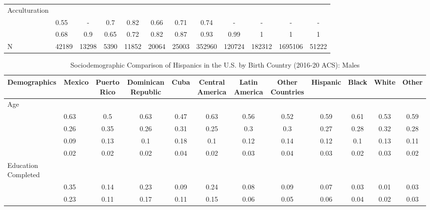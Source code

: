 \documentclass[
]{article}
\begin{document}
\begin{landscape}
\begin{table}[ht]
\begin{tabular}{>{\raggedright\arraybackslash}p{3.2cm}|lcccccc|cccc}
  Acculturation &  &  &  &  &  &  &  &  &  &  &  \\ 
  \multicolumn{1}{>{\raggedleft\arraybackslash}p{1.6cm}|}{\makebox[1.6cm][r]{Citizen }}& 0.55 & - & 0.7 & 0.82 & 0.66 & 0.71 & 0.74 & - & - & - & - \\ 
  \multicolumn{1}{>{\raggedleft\arraybackslash}p{3cm}|}{\makebox[3cm][r]{English Speakers }}& 0.68 & 0.9 & 0.65 & 0.72 & 0.82 & 0.87 & 0.93 & 0.99 & 1 & 1 & 1 \\ 
  N & 42189 & 13298 & 5390 & 11852 & 20064 & 25003 & 352960 & 120724 & 182312 & 1695106 & 51222 \\ 
   \hline
\end{tabular}
\endgroup
\end{table}


\begin{table}[ht]
\centering
\caption{Sociodemographic Comparison of Hispanics in the U.S. by Birth Country (2016-20 ACS): Males} 
\begingroup\small
\begin{tabular}{>{\raggedright\arraybackslash}p{3.2cm}|lcccccc|cccc}
  \hline
Demographics & Mexico & Puerto Rico & Dominican Republic & Cuba & Central America & Latin America & Other Countries & Hispanic & Black & White & Other \\ 
  \hline
Age &  &  &  &  &  &  &  &  &  &  &  \\ 
  \multicolumn{1}{>{\raggedleft\arraybackslash}p{1.5cm}|}{\makebox[1.5cm][r]{60 - 69 }}& 0.63 & 0.5 & 0.63 & 0.47 & 0.63 & 0.56 & 0.52 & 0.59 & 0.61 & 0.53 & 0.59 \\ 
  \multicolumn{1}{>{\raggedleft\arraybackslash}p{1.5cm}|}{\makebox[1.5cm][r]{70 - 79 }}& 0.26 & 0.35 & 0.26 & 0.31 & 0.25 & 0.3 & 0.3 & 0.27 & 0.28 & 0.32 & 0.28 \\ 
  \multicolumn{1}{>{\raggedleft\arraybackslash}p{1.5cm}|}{\makebox[1.5cm][r]{80 - 89 }}& 0.09 & 0.13 & 0.1 & 0.18 & 0.1 & 0.12 & 0.14 & 0.12 & 0.1 & 0.13 & 0.11 \\ 
  \multicolumn{1}{>{\raggedleft\arraybackslash}p{1.5cm}|}{\makebox[1.5cm][r]{90 plus }}& 0.02 & 0.02 & 0.02 & 0.04 & 0.02 & 0.03 & 0.04 & 0.03 & 0.02 & 0.03 & 0.02 \\ 
  Education Completed &  &  &  &  &  &  &  &  &  &  &  \\ 
  \multicolumn{1}{>{\raggedleft\arraybackslash}p{3.2cm}|}{\makebox[3.2cm][r]{Less than Primary }}& 0.35 & 0.14 & 0.23 & 0.09 & 0.24 & 0.08 & 0.09 & 0.07 & 0.03 & 0.01 & 0.03 \\ 
  \multicolumn{1}{>{\raggedleft\arraybackslash}p{1.7cm}|}{\makebox[1.7cm][r]{Primary }}& 0.23 & 0.11 & 0.17 & 0.11 & 0.15 & 0.06 & 0.05 & 0.06 & 0.04 & 0.02 & 0.03 \\ 

\end{tabular}
\end{table}
\end{landscape}
\end{document}
